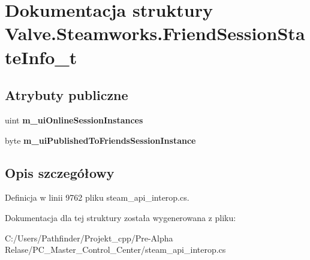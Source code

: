 \hypertarget{struct_valve_1_1_steamworks_1_1_friend_session_state_info__t}{}\section{Dokumentacja struktury Valve.\+Steamworks.\+Friend\+Session\+State\+Info\+\_\+t}
\label{struct_valve_1_1_steamworks_1_1_friend_session_state_info__t}
\subsection*{Atrybuty publiczne}
\begin{DoxyCompactItemize}
\item 
\mbox{\label{struct_valve_1_1_steamworks_1_1_friend_session_state_info__t_a553ea9dabd98cb59e02837e0fda3c3c8}} 
uint {\bfseries m\+\_\+ui\+Online\+Session\+Instances}
\item 
\mbox{\label{struct_valve_1_1_steamworks_1_1_friend_session_state_info__t_ad781438dfe6156adac189dd569e88226}} 
byte {\bfseries m\+\_\+ui\+Published\+To\+Friends\+Session\+Instance}
\end{DoxyCompactItemize}


\subsection{Opis szczegółowy}


Definicja w linii 9762 pliku steam\+\_\+api\+\_\+interop.\+cs.



Dokumentacja dla tej struktury została wygenerowana z pliku\+:\begin{DoxyCompactItemize}
\item 
C\+:/\+Users/\+Pathfinder/\+Projekt\+\_\+cpp/\+Pre-\/\+Alpha Relase/\+P\+C\+\_\+\+Master\+\_\+\+Control\+\_\+\+Center/steam\+\_\+api\+\_\+interop.\+cs\end{DoxyCompactItemize}
